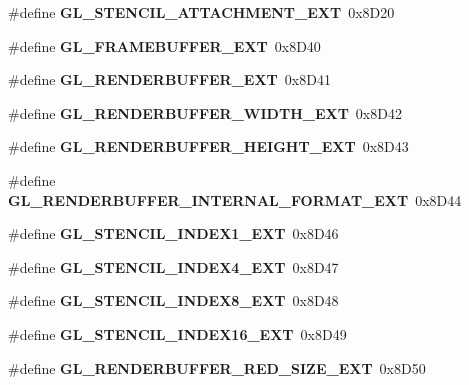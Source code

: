 \begin{DoxyCompactItemize}
\item 
\#define {\bfseries G\+L\+\_\+\+S\+T\+E\+N\+C\+I\+L\+\_\+\+A\+T\+T\+A\+C\+H\+M\+E\+N\+T\+\_\+\+E\+X\+T}~0x8\+D20\label{_s_d_l__opengl_8h_a44a68e4acac8d53163b052b77f574ad1}

\item 
\#define {\bfseries G\+L\+\_\+\+F\+R\+A\+M\+E\+B\+U\+F\+F\+E\+R\+\_\+\+E\+X\+T}~0x8\+D40\label{_s_d_l__opengl_8h_ae5a5d93368758da93a44c2fe8df29185}

\item 
\#define {\bfseries G\+L\+\_\+\+R\+E\+N\+D\+E\+R\+B\+U\+F\+F\+E\+R\+\_\+\+E\+X\+T}~0x8\+D41\label{_s_d_l__opengl_8h_ab100b55f57703b4c81a56ff9acf2f74b}

\item 
\#define {\bfseries G\+L\+\_\+\+R\+E\+N\+D\+E\+R\+B\+U\+F\+F\+E\+R\+\_\+\+W\+I\+D\+T\+H\+\_\+\+E\+X\+T}~0x8\+D42\label{_s_d_l__opengl_8h_ab83837bce35855de1ffc3785e824bc91}

\item 
\#define {\bfseries G\+L\+\_\+\+R\+E\+N\+D\+E\+R\+B\+U\+F\+F\+E\+R\+\_\+\+H\+E\+I\+G\+H\+T\+\_\+\+E\+X\+T}~0x8\+D43\label{_s_d_l__opengl_8h_a6f132e96954f63cca94246a874acaddf}

\item 
\#define {\bfseries G\+L\+\_\+\+R\+E\+N\+D\+E\+R\+B\+U\+F\+F\+E\+R\+\_\+\+I\+N\+T\+E\+R\+N\+A\+L\+\_\+\+F\+O\+R\+M\+A\+T\+\_\+\+E\+X\+T}~0x8\+D44\label{_s_d_l__opengl_8h_ac7ad1fe8d7abffcddc91938037978cda}

\item 
\#define {\bfseries G\+L\+\_\+\+S\+T\+E\+N\+C\+I\+L\+\_\+\+I\+N\+D\+E\+X1\+\_\+\+E\+X\+T}~0x8\+D46\label{_s_d_l__opengl_8h_a3a2da24fcb2c123fb45df3ade27602b1}

\item 
\#define {\bfseries G\+L\+\_\+\+S\+T\+E\+N\+C\+I\+L\+\_\+\+I\+N\+D\+E\+X4\+\_\+\+E\+X\+T}~0x8\+D47\label{_s_d_l__opengl_8h_a82bcf75fb2f7b0d550ffb6e0ccc942ed}

\item 
\#define {\bfseries G\+L\+\_\+\+S\+T\+E\+N\+C\+I\+L\+\_\+\+I\+N\+D\+E\+X8\+\_\+\+E\+X\+T}~0x8\+D48\label{_s_d_l__opengl_8h_af9ee0fca7fa7d1900f982c97c18bef79}

\item 
\#define {\bfseries G\+L\+\_\+\+S\+T\+E\+N\+C\+I\+L\+\_\+\+I\+N\+D\+E\+X16\+\_\+\+E\+X\+T}~0x8\+D49\label{_s_d_l__opengl_8h_a6b4436419191cffbd0c5bf603c77b0d8}

\item 
\#define {\bfseries G\+L\+\_\+\+R\+E\+N\+D\+E\+R\+B\+U\+F\+F\+E\+R\+\_\+\+R\+E\+D\+\_\+\+S\+I\+Z\+E\+\_\+\+E\+X\+T}~0x8\+D50\label{_s_d_l__opengl_8h_a714c447403500de38ae3739f06749aa9}


\end{DoxyCompactItemize}
